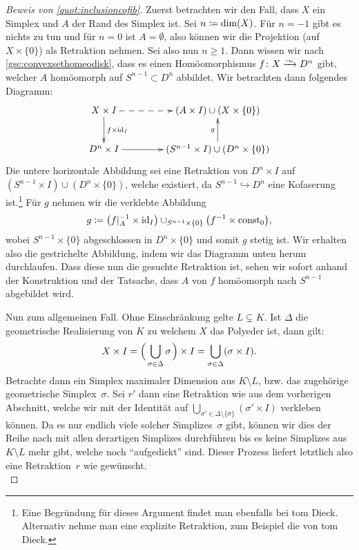 \begin{proof}[Beweis von \cref{quot:inclusioncofib}]
    \pagebreak[2]
    Zuerst betrachten wir den Fall, dass $X$ ein Simplex und $A$ der Rand
    des Simplex ist. Sei $n\coloneqq\dim(X)$. Für $n=-1$ gibt es nichts zu tun und
    für $n=0$ ist $A=\emptyset$, also können wir die Projektion (auf
    $X\times\{0\}$) als Retraktion nehmen. Sei also nun $n\geq1$. Dann wissen
    wir nach \cref{gsc:convexsethomeodisk}, dass es einen Homöomorphismus
    $f\colon X \isorightarrow D^n$ gibt, welcher $A$ homöomorph auf
    $S^{n-1}\subset D^n$ abbildet.
    Wir betrachten dann folgendes Diagramm:
    \begin{equation*}
        \begin{xy}
            \xymatrix@C=1.5cm{
                X\times I \ar@{-->}[r] \ar[d]^{f\times\id_I}
                & (A\times I)\cup(X\times\{0\})    
                \\
                D^n\times I \ar[r] 
                & (S^{n-1}\times I)\cup(D^n\times\{0\}) \ar[u]^g
            }
        \end{xy}
    \end{equation*}
    Die untere horizontale Abbildung sei eine Retraktion von $D^n\times I$ auf
    $(S^{n-1}\times I)\cup(D^n\times\{0\})$, welche existiert, da
    $S^{n-1}\hookrightarrow D^n$ eine Kofaserung ist.\footnote{%
        Eine Begründung für dieses Argument findet man ebenfalls bei
        tom Dieck\cite[Ch.\,5,.2]{bookc:tomdieck08}.
        Alternativ nehme man eine explizite Retraktion, zum Beispiel die von
        tom Dieck\cite[Ch.\,2,.5]{bookc:tomdieck08}.%
    }
    Für $g$ nehmen wir die
    verklebte Abbildung 
    \[ g \coloneqq \bigl(f\vert_A^{-1} \times\operatorname{id}_I\bigr) \cup_{S^{n-1}\times\{0\}}
        \bigl( f^{-1}\times\operatorname{const}_0 \bigr)
    , \]
    wobei $S^{n-1}\times\{0\}$ abgeschlossen in $D^n\times\{0\}$ und somit $g$
    stetig ist. 
    Wir erhalten also die gestrichelte Abbildung, indem wir das Diagramm unten
    herum durchlaufen. Dass diese nun die gesuchte Retraktion ist, sehen wir
    sofort anhand der Konstruktion und der Tatsache, dass $A$ von $f$ homöomorph
    nach $S^{n-1}$ abgebildet wird.    

    Nun zum allgemeinen Fall. Ohne Einschränkung gelte 
    $L \subsetneq K$. Ist $\Delta$ die geometrische Realisierung
    von $K$ zu welchem $X$ das Polyeder ist, dann gilt:
    \[ X \times I 
        = \Bigl(\, \bigcup_{\sigma\in\Delta} \sigma \mkern2mu\Bigr) \times I
        = \bigcup_{\sigma\in\Delta} (\sigma\times I)
    . \]
    Betrachte dann ein Simplex maximaler Dimension aus $K\setminus L$, bzw. das
    zugehörige geometrische Simplex~$\sigma$. Sei $r'$ dann eine Retraktion wie
    aus dem vorherigen Abschnitt, welche wir mit der Identität auf
    $\bigcup_{\sigma'\in\Delta\setminus\{\sigma\}} (\sigma'\times I)$ verkleben
    können. Da es nur endlich viele solcher Simplizes~$\sigma$ gibt, können wir
    dies der Reihe nach mit allen derartigen Simplizes durchführen bis es keine
    Simplizes aus $K\setminus L$ mehr gibt, welche noch \enquote{aufgedickt}
    sind. Dieser Prozess liefert letztlich also eine Retraktion~$r$ wie
    gewünscht.
    \\
\end{proof}
